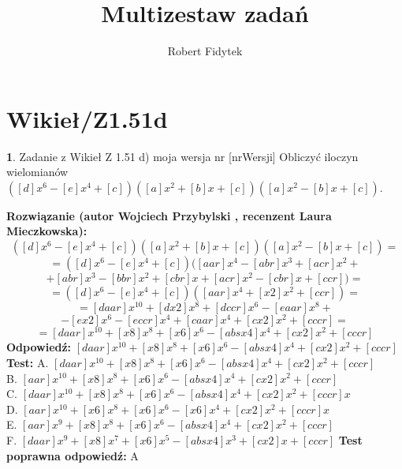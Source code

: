 \documentclass[12pt, a4paper]{article}
\title{Multizestaw zadań}
\author{Robert Fidytek}
\date{}
\theoremstyle{definition} %
\newtheorem{zad}{}
\newcommand{\kategoria}[1]{\section{#1}} %
\newcommand{\zadStart}[1]{\begin{zad}#1\newline} %
\newcommand{\zadStop}{\end{zad}}   %
\newcommand{\rozwStart}[2]{\noindent \textbf{Rozwiązanie (autor #1 , recenzent #2): }\newline} %
\newcommand{\rozwStop}{\newline}                                            %
\newcommand{\odpStart}{\noindent \textbf{Odpowiedź:}\newline}    %
\newcommand{\odpStop}{\newline}                                             %
\newcommand{\testStart}{\noindent \textbf{Test:}\newline} %
\newcommand{\testStop}{\newline} %
\newcommand{\kluczStart}{\noindent \textbf{Test poprawna odpowiedź:}\newline} %
\newcommand{\kluczStop}{\newline} %
\begin{document}
\maketitle


\kategoria{Wikieł/Z1.51d}
\zadStart{Zadanie z Wikieł Z 1.51 d) moja wersja nr [nrWersji]}
Obliczyć iloczyn wielomianów $([d]x^{6}-[e]x^{4}+[c])([a]x^{2}+[b]x+[c])([a]x^{2}-[b]x+[c])$.
\zadStop
\rozwStart{Wojciech Przybylski}{Laura Mieczkowska}
$$([d]x^{6}-[e]x^{4}+[c])([a]x^{2}+[b]x+[c])([a]x^{2}-[b]x+[c])=$$
$$=([d]x^{6}-[e]x^{4}+[c])([aar]x^{4}-[abr]x^{3}+[acr]x^{2}+$$
$$+[abr]x^{3}-[bbr]x^{2}+[cbr]x+[acr]x^{2}-[cbr]x+[ccr])=$$
$$=([d]x^{6}-[e]x^{4}+[c])([aar]x^{4}+[x2]x^{2}+[ccr])=$$
$$=[daar]x^{10}+[dx2]x^{8}+[dccr]x^{6}-[eaar]x^{8}+$$
$$-[ex2]x^{6}-[eccr]x^{4}+[caar]x^{4}+[cx2]x^{2}+[cccr]=$$
$$=[daar]x^{10}+[x8]x^{8}+[x6]x^{6}-[absx4]x^{4}+[cx2]x^{2}+[cccr]$$
\rozwStop
\odpStart
$[daar]x^{10}+[x8]x^{8}+[x6]x^{6}-[absx4]x^{4}+[cx2]x^{2}+[cccr]$
\odpStop
\testStart
A. $[daar]x^{10}+[x8]x^{8}+[x6]x^{6}-[absx4]x^{4}+[cx2]x^{2}+[cccr]$\\
B. $[aar]x^{10}+[x8]x^{8}+[x6]x^{6}-[absx4]x^{4}+[cx2]x^{2}+[cccr]$\\
C. $[daar]x^{10}+[x8]x^{8}+[x6]x^{6}-[absx4]x^{4}+[cx2]x^{2}+[cccr]x$\\
D. $[aar]x^{10}+[x6]x^{8}+[x6]x^{6}-[x6]x^{4}+[cx2]x^{2}+[cccr]x$\\
E. $[aar]x^{9}+[x8]x^{8}+[x6]x^{6}-[absx4]x^{4}+[cx2]x^{2}+[cccr]$\\
F. $[daar]x^{9}+[x8]x^{7}+[x6]x^{5}-[absx4]x^{3}+[cx2]x+[cccr]$
\testStop
\kluczStart
A
\kluczStop
\end{document}

